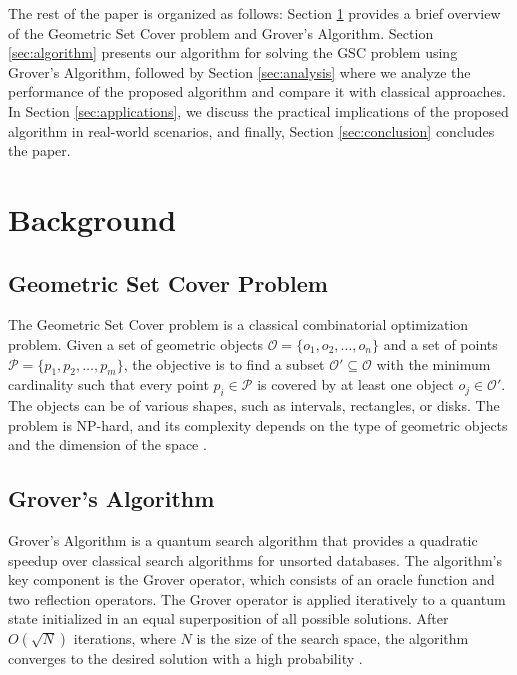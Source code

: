 The rest of the paper is organized as follows: Section \ref{sec:background} provides a brief overview of the Geometric Set Cover problem and Grover's Algorithm. Section \ref{sec:algorithm} presents our algorithm for solving the GSC problem using Grover's Algorithm, followed by Section \ref{sec:analysis} where we analyze the performance of the proposed algorithm and compare it with classical approaches. In Section \ref{sec:applications}, we discuss the practical implications of the proposed algorithm in real-world scenarios, and finally, Section \ref{sec:conclusion} concludes the paper.

\section{Background}
\label{sec:background}

\subsection{Geometric Set Cover Problem}

The Geometric Set Cover problem is a classical combinatorial optimization problem. Given a set of geometric objects $\mathcal{O} = \{o_1, o_2, \ldots, o_n\}$ and a set of points $\mathcal{P} = \{p_1, p_2, \ldots, p_m\}$, the objective is to find a subset $\mathcal{O}' \subseteq \mathcal{O}$ with the minimum cardinality such that every point $p_i \in \mathcal{P}$ is covered by at least one object $o_j \in \mathcal{O}'$. The objects can be of various shapes, such as intervals, rectangles, or disks. The problem is NP-hard, and its complexity depends on the type of geometric objects and the dimension of the space \cite{broninmaksimenko2011}.

\subsection{Grover's Algorithm}

Grover's Algorithm is a quantum search algorithm that provides a quadratic speedup over classical search algorithms for unsorted databases. The algorithm's key component is the Grover operator, which consists of an oracle function and two reflection operators. The Grover operator is applied iteratively to a quantum state initialized in an equal superposition of all possible solutions. After $O(\sqrt{N})$ iterations, where $N$ is the size of the search space, the algorithm converges to the desired solution with a high probability \cite{grover1996}.

